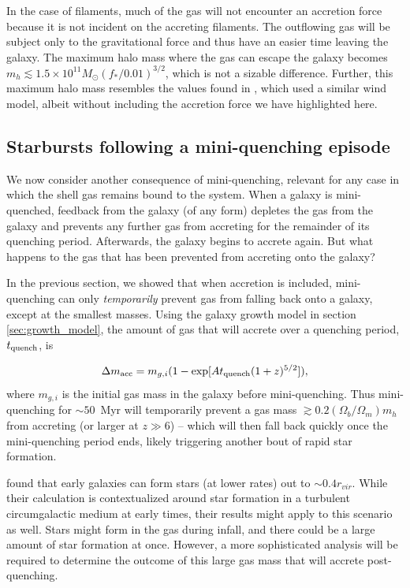 \documentclass[a4paper,11pt]{article}
\begin{document}
In the case of filaments, much of the gas will not encounter an accretion force because it is not incident on the accreting filaments. The outflowing gas will be subject only to the gravitational force and thus have an easier time leaving the galaxy. The maximum halo mass where the gas can escape the galaxy becomes $m_{h} \lesssim 1.5 \times 10^{11} M_{\odot} (f_{*}/0.01)^{3/2}$, which is not a sizable difference. Further, this maximum halo mass resembles the values found in \cite{Furlanetto2003_winds}, which used a similar wind model, albeit without including the accretion force we have highlighted here.

\subsection{Starbursts following a mini-quenching episode} \label{sec:reaccretion}

We now consider another consequence of mini-quenching, relevant for any case in which the shell gas remains bound to the system. When a galaxy is mini-quenched, feedback from the galaxy (of any form) depletes the gas from the galaxy and prevents any further gas from accreting for the remainder of its quenching period. Afterwards, the galaxy begins to accrete again. But what happens to the gas that has been prevented from accreting onto the galaxy?

In the previous section, we showed that when accretion is included, mini-quenching can only \emph{temporarily} prevent gas from falling back onto a galaxy, except at the smallest masses. Using the galaxy growth model in section \ref{sec:growth_model}, the amount of gas that will accrete over a quenching period, $t_{\rm quench}$, is

\begin{equation}
	\Delta m_{\rm acc} = m_{g, i} (1 - \exp [ A t_{\rm quench} (1 + z)^{5/2} ] ),
\end{equation}
%
where $m_{g, i}$ is the initial gas mass in the galaxy before mini-quenching. Thus mini-quenching for $\sim 50$~Myr will temporarily prevent a gas mass $\gtrsim 0.2 (\Omega_b/\Omega_m) m_h$ from accreting (or larger at $z \gg 6$)  -- which will then fall back quickly once the mini-quenching period ends, likely triggering another bout of rapid star formation. 

\cite{Sun2026} found that early galaxies can form stars (at lower rates) out to $\sim 0.4 r_{vir}$. While their calculation is contextualized around star formation in a turbulent circumgalactic medium at early times, their results might apply to this scenario as well. Stars might form in the gas during infall, and there could be a large amount of star formation at once. However, a more sophisticated analysis will be required to determine the outcome of this large gas mass that will accrete post-quenching. 
\end{document}
